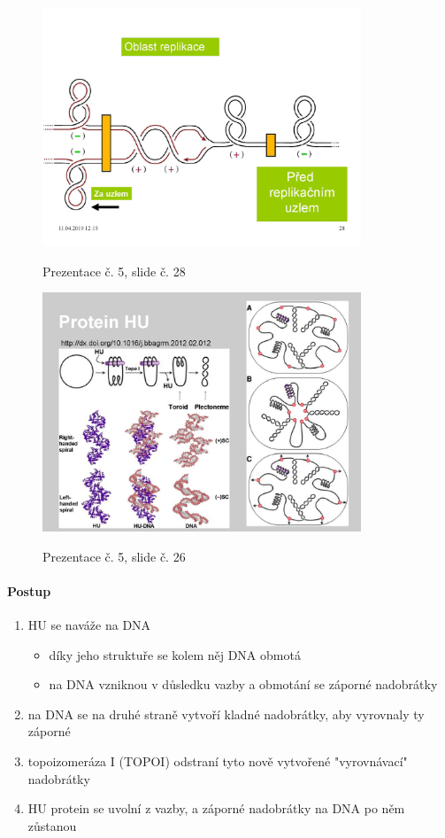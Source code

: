 \documentclass[DIV=8]{scrreprt}
\begin{document}
\begin{figure}
    \caption{Prezentace č. 5, slide č. 28}
    \includegraphics[width=0.85\textwidth]{slides-5/slide-28.jpg}
    \centering
    \label{slides-5-slide-28}
\end{figure}
\begin{figure}
    \caption{Prezentace č. 5, slide č. 26}
    \includegraphics[width=0.85\textwidth]{slides-5/slide-26.jpg}
    \centering
    \label{slides-5-slide-26}
\end{figure}

\paragraph{Postup}
\begin{enumerate}[nosep]
    \item HU se naváže na DNA
\begin{itemize}[nosep]
    \item díky jeho struktuře se kolem něj DNA obmotá
    \item na DNA vzniknou v důsledku vazby a obmotání se záporné nadobrátky
\end{itemize}

    \item na DNA se na druhé straně vytvoří kladné nadobrátky, aby vyrovnaly ty záporné
    \item topoizomeráza I (TOPOI) odstraní tyto nově vytvořené "vyrovnávací" nadobrátky
    \item HU protein se uvolní z vazby, a záporné nadobrátky na DNA po něm zůstanou
\end{enumerate}
\end{document}

